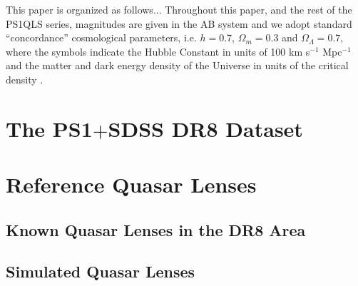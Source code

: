 \documentclass[useAMS,usenatbib]{mn2e}
\begin{document}







This paper is organized as follows... Throughout this paper, and the
rest of the PS1QLS series, magnitudes are given in the AB system
\citep{Oke74} and we adopt standard ``concordance'' cosmological
parameters, i.e. $h=0.7$, $\Omega_m=0.3$ and $\Omega_\Lambda=0.7$, where
the symbols indicate the Hubble Constant in units of 100 km s$^{-1}$
Mpc$^{-1}$ and the matter and dark energy density of the Universe in
units of the critical density \citep[e.g.\ ][]{Kom++09}.



\section{The PS1$+$SDSS DR8 Dataset}
\label{sec:data}




\section{Reference Quasar Lenses}
\label{sec:ref}

\subsection{Known Quasar Lenses in the DR8 Area}
\label{sec:ref:known}


\subsection{Simulated Quasar Lenses}
\label{sec:ref:mock}
\end{document}
